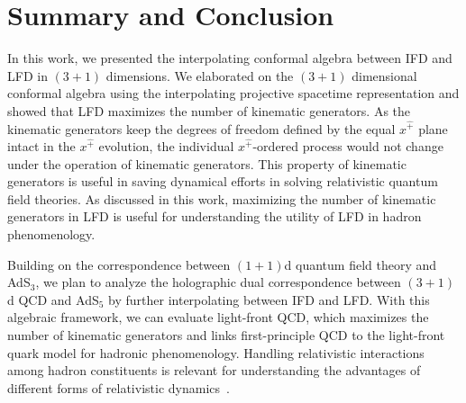 \documentclass[foundations,article,submit,pdftex,moreauthors]{Definitions/mdpi}
\begin{document}
\KinematicGeneratorTable
\FloatBarrier


\section{Summary and Conclusion}
\label{summary-conclusion}

In this work, we presented the interpolating conformal algebra between IFD and LFD in $(3+1)$ dimensions. We elaborated on the $(3+1)$ dimensional conformal algebra using the interpolating projective spacetime representation and showed that LFD maximizes the number of kinematic generators. 
{ As the kinematic generators keep the degrees of freedom defined by the equal $x^{\hat +}$ plane intact in the $x^{\hat +}$ evolution, the individual $x^{\hat +}$-ordered process would not change under the operation of kinematic generators. This property of kinematic generators is useful in saving dynamical efforts in solving relativistic quantum field theories. As discussed in this work, maximizing the number of kinematic generators in LFD is useful for understanding the utility of LFD in hadron phenomenology.
}


Building on the correspondence between $(1+1)$d quantum field theory and AdS$_3$, we plan to analyze the holographic dual correspondence between $(3+1)$d QCD and AdS$_5$ by further interpolating between IFD and LFD. With this algebraic framework, we can evaluate light-front QCD, which maximizes the number of kinematic generators and links first-principle QCD to the light-front quark model for hadronic phenomenology. Handling relativistic interactions among hadron constituents is relevant for understanding the advantages of different forms of relativistic dynamics~\cite{Ji2025}.



\appendix
\setcounter{section}{0}
\end{document}
